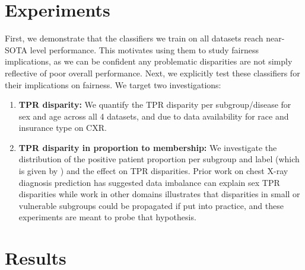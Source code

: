 \documentclass{ws-procs11x85}
\begin{document}
\section{Experiments}
\label{Sec:Experiments}
First, we demonstrate that the classifiers we train on all datasets reach near-SOTA level performance. This motivates using them to study fairness implications, as we can be confident any problematic disparities are not simply reflective of poor overall performance. 
Next, we explicitly test these classifiers for their implications on fairness. We target two investigations:
\begin{enumerate}
\item \textbf{TPR disparity:} We quantify the TPR disparity per subgroup/disease for sex and age across all 4 datasets, and due to data availability for race and insurance type on CXR.  

\item \textbf{TPR disparity in proportion to membership:} We investigate the distribution of the positive patient proportion per subgroup  and label  (which is given by ) and the effect on TPR disparities.
Prior work on chest X-ray diagnosis prediction has suggested data imbalance can explain sex TPR disparities\cite{larrazabal2020gender} while work in other domains illustrates that disparities in small or vulnerable subgroups could be propagated if put into practice,\cite{de2019bias, hashimoto_fairness_2018} and these experiments are meant to probe that hypothesis.
\end{enumerate}

\section{Results}
\end{document}
